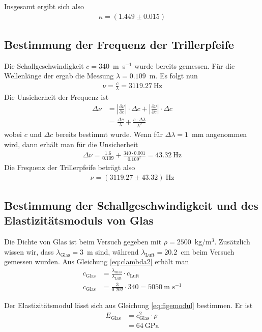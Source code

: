 \documentclass{article}
\begin{document}
Insgesamt ergibt sich also
\begin{align*}
\kappa = (1.449 \pm 0.015)
\end{align*}

\subsection{Bestimmung der Frequenz der Trillerpfeife}

Die Schallgeschwindigkeit $c = 340$~m~s${}^{-1}$ wurde bereits gemessen. Für die Wellenlänge der ergab die Messung $\lambda=0.109$~m.
Es folgt nun
\begin{align}
\nu = \frac{c}{\lambda} = 3119.27~\text{Hz}
\end{align}
Die Unsicherheit der Frequenz ist
\begin{align}
\Delta\nu &= \left|\frac{\partial \nu}{\partial c}\right| \cdot \Delta c + \left|\frac{\partial \nu}{\partial c}\right| \cdot \Delta c \\
&= \frac{\Delta c}{\lambda} + \frac{c\cdot \Delta\lambda}{\lambda^2} 
\end{align}
wobei $c$ und $\Delta c$ bereits bestimmt wurde. Wenn für $\Delta\lambda=1$~mm angenommen wird, dann erhält man für die Unsicherheit 
\begin{align}
\Delta \nu = \frac{1.6}{0.109} + \frac{340 \cdot 0.001}{0.109^2} = 43.32~\text{Hz}
\end{align}
Die Frequenz der Trillerpfeife beträgt also
\begin{align*}
\nu = (3119.27\pm 43.32)~\text{Hz}
\end{align*}
\subsection{Bestimmung der Schallgeschwindigkeit und des Elastizitätsmoduls von Glas}

Die Dichte von Glas ist beim Versuch gegeben mit $\rho=2500$~kg/m${}^3$. Zusätzlich wissen wir, dass $\lambda_\text{Glas} = 3$~m sind, während $\lambda_\text{Luft} = 20.2$~cm beim Versuch gemessen wurden. Aus Gleichung \eqref{eq:clambda2} erhält man
\begin{align}
c_\text{Glas} &= \frac{\lambda_{\text{Glas}}}{\lambda_\text{Luft}} \cdot c_\text{Luft} \\
c_\text{Glas} &= \frac{3}{0.202}\cdot 340 = 5050~\text{m s}^{-1}
\end{align}

Der Elastizitätsmodul lässt sich aus Gleichung \eqref{eq:figemodul} bestimmen. Er ist
\begin{align}
\label{eq:emodulglass}
E_\text{Glas} &= c_\text{Glas}^2 \cdot \rho \\
&= 64~\text{GPa}
\end{align}
\end{document}

